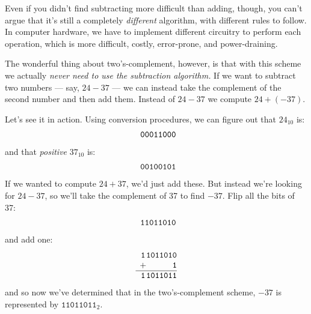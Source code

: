 Even if you didn't find subtracting more difficult than adding, though, you
can't argue that it's still a completely \textit{different} algorithm, with
different rules to follow. In computer hardware, we have to implement
different circuitry to perform each operation, which is more difficult,
costly, error-prone, and power-draining.

The wonderful thing about two's-complement, however, is that with this
scheme we actually \textit{never need to use the subtraction algorithm.} If
we want to subtract two numbers --- say, $24 - 37$ --- we can instead take
the complement of the second number and then add them. Instead of $24-37$
we compute $24 + (-37)$. 

Let's see it in action. Using conversion procedures, we can figure out that
$24_{10}$ is:
\[
\begin{array}{*{8}{c@{\hspace{0pt}}}}
 \texttt{0} & \texttt{0} & \texttt{0} & \texttt{1} & \texttt{1} & \texttt{0} & \texttt{0} & \texttt{0} \\
\end{array}
\]
and that \textit{positive} $37_{10}$ is:
\[
\begin{array}{*{8}{c@{\hspace{0pt}}}}
 \texttt{0} & \texttt{0} & \texttt{1} & \texttt{0} & \texttt{0} & \texttt{1} & \texttt{0} & \texttt{1} \\
\end{array}
\]
If we wanted to compute $24+37$, we'd just add these. But instead
we're looking for $24-37$, so we'll take the complement of 37 to find
$-37$. Flip all the bits of 37:
\[
\begin{array}{*{8}{c@{\hspace{0pt}}}}
 \texttt{1} & \texttt{1} & \texttt{0} & \texttt{1} & \texttt{1} & \texttt{0} & \texttt{1} & \texttt{0} \\
\end{array}
\]
and add one:
\[
\begin{array}{*{9}{c@{\hspace{0pt}}}}
 \texttt{1} & \texttt{1} & \texttt{0} & \texttt{1} & \texttt{1} & \texttt{0} & \texttt{1} & \texttt{0} \\
 + & \texttt{ } & \texttt{ } & \texttt{ } & \texttt{ } & \texttt{ } & \texttt{ } & \texttt{1} \\
\hline
 \texttt{1} & \texttt{1} & \texttt{0} & \texttt{1} & \texttt{1} & \texttt{0} & \texttt{1} & \texttt{1} \\
\end{array}
\]
and so now we've determined that in the two's-complement scheme, $-37$ is
represented by $\texttt{11011011}_2$.

